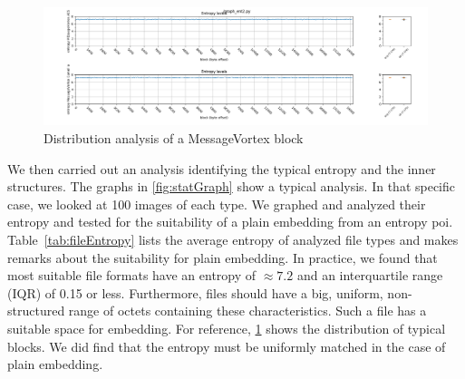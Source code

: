 \begin{figure}[ht]
	\includegraphics[width=\textwidth]{inc/statanalysis_mv}
	\caption{Distribution analysis of a MessageVortex block}
	\label{fig:statMvGraph}
\end{figure}

We then carried out an analysis identifying the typical entropy and the inner structures. The graphs in \cref{fig:statGraph} show a typical analysis. In that specific case, we looked at 100 images of each type. We graphed and analyzed their entropy and tested for the suitability of a plain embedding from an entropy poi. Table~\ref{tab:fileEntropy} lists the average entropy of analyzed file types and makes remarks about the suitability for plain embedding. In practice, we found that most suitable file formats have an entropy of $\approx 7.2$ and an interquartile range (IQR) of 0.15 or less. Furthermore, files should have a big, uniform, non-structured range of octets containing these characteristics. Such a file has a suitable space for embedding. For reference, \cref{fig:statMvGraph} shows the distribution of typical \MessageVortex{} blocks. We did find that the entropy must be uniformly matched in the case of plain embedding.


